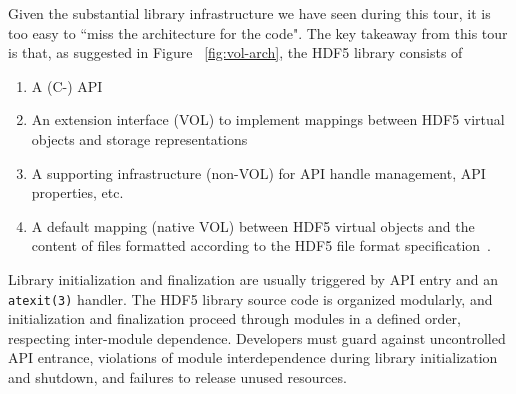 Given the substantial library infrastructure we have seen during this tour, it is too easy to ``miss the architecture for the code". The key takeaway from this tour is that, as suggested in Figure ~\ref{fig:vol-arch}, the HDF5 library consists of
\begin{enumerate}
    \item A (C-) API
    \item An extension interface (VOL) to implement mappings between HDF5 virtual objects and storage representations
    \item A supporting infrastructure (non-VOL) for API handle management, API properties, etc.
    \item A default mapping (native VOL) between HDF5 virtual objects and the content of files formatted according to the HDF5 file format specification~\cite{ffmt}.
\end{enumerate}

Library initialization and finalization are usually triggered by API entry and an \texttt{atexit(3)} handler. The HDF5 library source code is organized modularly, and initialization and finalization proceed through modules in a defined order, respecting inter-module dependence. Developers must guard against uncontrolled API entrance, violations of module interdependence during library initialization and shutdown, and failures to release unused resources.
